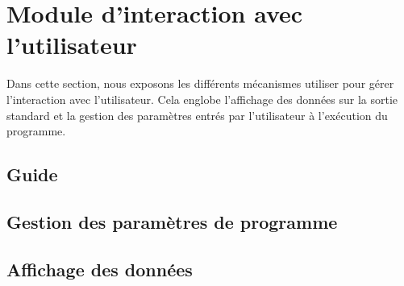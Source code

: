 \section{Module d'interaction avec l’utilisateur}
Dans cette section, nous exposons les différents mécanismes utiliser pour gérer l’interaction avec l’utilisateur. Cela englobe l’affichage des données sur la sortie standard et la gestion des paramètres entrés par l’utilisateur à l’exécution du programme.

\subsection{Guide}

\subsection{Gestion des paramètres de programme}


\subsection{Affichage des données}